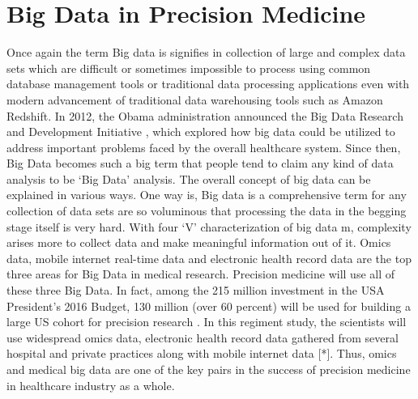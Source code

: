 \documentclass[sigconf]{acmart}
\begin{document}
\section{Big Data in Precision Medicine} Once again the term Big data is signifies in collection of large and complex data sets which are difficult or sometimes impossible to process using common database management tools or traditional data processing applications even with modern advancement of traditional data warehousing tools such as Amazon Redshift. In 2012, the Obama administration announced the Big Data Research and Development Initiative \cite{editor06}, which explored how big data could be utilized to address important problems faced by the overall healthcare system. Since then, Big Data becomes such a big term that people tend to claim any kind of data analysis to be ‘Big Data’ analysis. The overall concept of big data can be explained in various ways. One way is, Big data is a comprehensive term for any collection of data sets are so voluminous that processing the data in the begging stage itself is very hard.  With four ‘V’ characterization of big data m, complexity arises more to collect data and make meaningful information out of it. Omics data, mobile internet real-time data and electronic health record data are the top three areas for Big Data in medical research. Precision medicine will use all of these three Big Data. In fact, among the 215 million investment in the USA President’s 2016 Budget, 130 million (over 60  percent) will be used for building a large US cohort for precision research \cite{editor06}. In this regiment study, the scientists will use widespread omics data, electronic health record data gathered from several hospital and private practices along with mobile internet data [*]. Thus, omics and medical big data are one of the key pairs in the success of precision medicine in healthcare industry as a whole.
\end{document}
